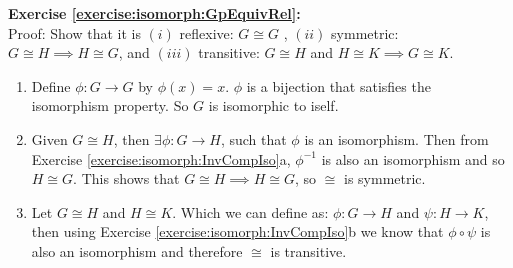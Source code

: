 \noindent\textbf{Exercise \ref{exercise:isomorph:GpEquivRel}:}
\\
Proof: Show that it is $(i)$ reflexive: $G \cong G$ , $(ii)$ symmetric: $G \cong H \implies H \cong G$, and $(iii)$ transitive: $G \cong H$ and $H \cong K \implies G \cong K$. 
\begin{enumerate}[($i$)]
\item
Define $\phi: G \rightarrow G$ by $\phi(x) = x$.  $\phi$ is a bijection that satisfies the isomorphism property.  So $G$ is isomorphic to iself.

\item
Given $G \cong H$, then $\exists \phi: G\rightarrow H$, such that $\phi$ is an isomorphism. Then from Exercise \ref{exercise:isomorph:InvCompIso}a, $\phi^{-1}$ is also an isomorphism and so $H \cong G$. This shows that $G \cong H \implies H \cong G$, so $\cong$ is symmetric.

\item
Let $G \cong H$ and $H \cong K$. Which we can define as: $\phi: G \rightarrow H$ and $\psi: H \rightarrow K$, then using Exercise \ref{exercise:isomorph:InvCompIso}b we know that $\phi \circ \psi$ is also an isomorphism and therefore $\cong$ is transitive.
\end{enumerate}


